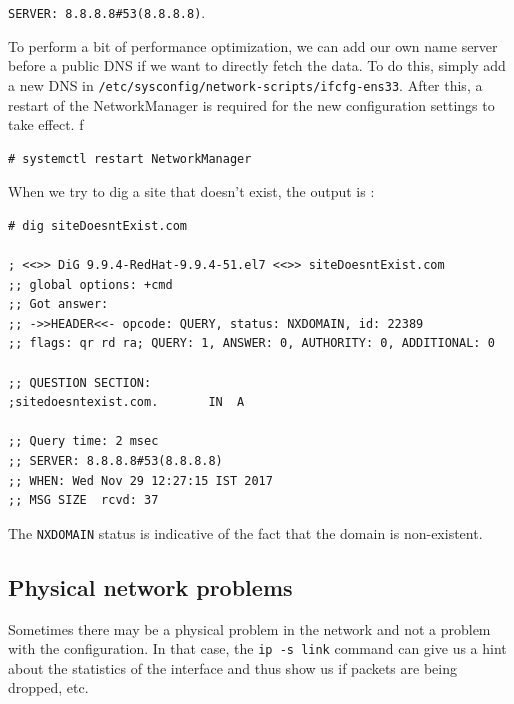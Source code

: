 \verb|SERVER: 8.8.8.8#53(8.8.8.8)|.

To perform a bit of performance optimization, we can add our own name server before a public DNS if we want to directly fetch the data. To do this, simply add a new DNS in \verb|/etc/sysconfig/network-scripts/ifcfg-ens33|. After this, a restart of the NetworkManager is required for the new configuration settings to take effect. f

\vspace{-15pt}
\begin{verbatim}
# systemctl restart NetworkManager
\end{verbatim}
\vspace{-10pt}

When we try to dig a site that doesn't exist, the output is :

\vspace{-15pt}
\begin{verbatim}
# dig siteDoesntExist.com

; <<>> DiG 9.9.4-RedHat-9.9.4-51.el7 <<>> siteDoesntExist.com
;; global options: +cmd
;; Got answer:
;; ->>HEADER<<- opcode: QUERY, status: NXDOMAIN, id: 22389
;; flags: qr rd ra; QUERY: 1, ANSWER: 0, AUTHORITY: 0, ADDITIONAL: 0

;; QUESTION SECTION:
;sitedoesntexist.com.		IN	A

;; Query time: 2 msec
;; SERVER: 8.8.8.8#53(8.8.8.8)
;; WHEN: Wed Nov 29 12:27:15 IST 2017
;; MSG SIZE  rcvd: 37
\end{verbatim}
\vspace{-10pt}

The \verb|NXDOMAIN| status is indicative of the fact that the domain is non-existent. 

\subsection{Physical network problems}
Sometimes there may be a physical problem in the network and not a problem with the configuration. In that case, the \verb|ip -s link| command can give us a hint about the statistics of the interface and thus show us if packets are being dropped, etc.

